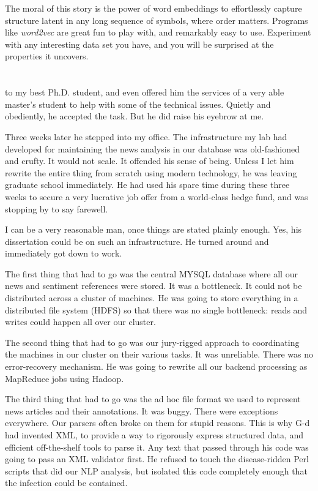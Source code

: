 \documentclass[10pt]{article}
\begin{document}
\begin{enumerate}
The moral of this story is the power of word embeddings to effortlessly capture structure latent in any long sequence of symbols, where order matters. Programs like \textit{word2vec} are great fun to play with, and remarkably easy to use. Experiment with any interesting data set you have, and you will be surprised at the properties it uncovers.
\section*{} %
to my best Ph.D. student, and even offered him the services of a very able master's student to help with some of the technical issues. Quietly and obediently, he accepted the task. But he did raise his eyebrow at me.

Three weeks later he stepped into my office. The infrastructure my lab had developed for maintaining the news analysis in our database was old-fashioned and crufty. It would not scale. It offended his sense of being. Unless I let him rewrite the entire thing from scratch using modern technology, he was leaving graduate school immediately. He had used his spare time during these three weeks to secure a very lucrative job offer from a world-class hedge fund, and was stopping by to say farewell.

I can be a very reasonable man, once things are stated plainly enough. Yes, his dissertation could be on such an infrastructure. He turned around and immediately got down to work.

The first thing that had to go was the central MYSQL database where all our news and sentiment references were stored. It was a bottleneck. It could not be distributed across a cluster of machines. He was going to store everything in a distributed file system (HDFS) so that there was no single bottleneck: reads and writes could happen all over our cluster.

The second thing that had to go was our jury-rigged approach to coordinating the machines in our cluster on their various tasks. It was unreliable. There was no error-recovery mechanism. He was going to rewrite all our backend processing as MapReduce jobs using Hadoop.

The third thing that had to go was the ad hoc file format we used to represent news articles and their annotations. It was buggy. There were exceptions everywhere. Our parsers often broke on them for stupid reasons. This is why G-d had invented XML, to provide a way to rigorously express structured data, and efficient off-the-shelf tools to parse it. Any text that passed through his code was going to pass an XML validator first. He refused to touch the disease-ridden Perl scripts that did our NLP analysis, but isolated this code completely enough that the infection could be contained.


\end{enumerate}
\end{document}
